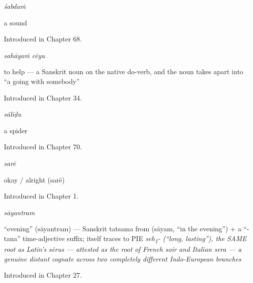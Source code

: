 \noindent\begin{minipage}[t]{\linewidth}
\raggedright
\textbf{}\enspace\emph{śabdaṁ}\par
\small a sound\par
\footnotesize Introduced in Chapter 68.
\end{minipage}\par\medskip

\noindent\begin{minipage}[t]{\linewidth}
\raggedright
\textbf{ }\enspace\emph{sahāyaṁ cēyu}\par
\small to help — a Sanskrit noun on the native do-verb, and the noun takes apart into \textquotedblleft{}a going with somebody\textquotedblright{}\par
\footnotesize Introduced in Chapter 34.
\end{minipage}\par\medskip

\noindent\begin{minipage}[t]{\linewidth}
\raggedright
\textbf{}\enspace\emph{sālīḍu}\par
\small a spider\par
\footnotesize Introduced in Chapter 70.
\end{minipage}\par\medskip

\noindent\begin{minipage}[t]{\linewidth}
\raggedright
\textbf{}\enspace\emph{sarē}\par
\small okay / alright (sarē)\par
\footnotesize Introduced in Chapter 1.
\end{minipage}\par\medskip

\noindent\begin{minipage}[t]{\linewidth}
\raggedright
\textbf{}\enspace\emph{sāyantram}\par
\small \textquotedblleft{}evening\textquotedblright{} (sāyantram) — Sanskrit tatsama from  (sāyam, \textquotedblleft{}in the evening\textquotedblright{}) + a \textquotedblleft{}-tana\textquotedblright{} time-adjective suffix;  itself traces to PIE \emph{seh\textsubscript{1}- (\textquotedblleft{}long, lasting\textquotedblright{}), the SAME root as Latin's sērus — attested as the root of French soir and Italian sera — a genuine distant cognate across two completely different Indo-European branches}\par
\footnotesize Introduced in Chapter 27.
\end{minipage}\par\medskip

